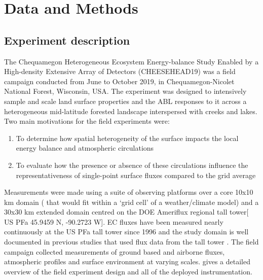 \documentclass[draft]{agujournal2019}
\begin{document}
%

\section{Data and Methods}

\subsection{ Experiment description}

The Chequamegon Heterogeneous Ecosystem Energy-balance Study Enabled by a High-density Extensive Array of Detectors  (CHEESEHEAD19) was a field campaign conducted from June to October 2019, in Chequamegon-Nicolet National Forest, Wisconsin, USA. The experiment was designed to intensively sample and scale land surface properties and the ABL responses to it across a heterogeneous mid-latitude forested landscape interspersed with creeks and lakes.
Two main motivations for the field experiments were:

\begin{enumerate}
    \item To determine how spatial heterogeneity of the surface impacts the local energy balance and  atmospheric circulations
    \item To evaluate how the presence or absence of these circulations influence the representativeness of single-point surface fluxes compared to the grid average 
\end{enumerate}

Measurements were made using a suite of observing platforms over a core 10x10 km domain ( that would fit within a ‘grid cell’ of a weather/climate model)  and a 30x30 km extended domain centred on the DOE Ameriflux regional tall tower[ US PFa 45.9459 N, -90.2723 W].  EC fluxes have been measured nearly continuously at the US PFa tall tower since 1996 \cite{berger_long-term_2001} and the study domain  is well documented in previous studies that used flux data from the tall tower \cite{davis_annual_2003, desai_influence_2014, desai_landscape-level_2015}. The field campaign collected measurements of ground based and airborne fluxes, atmospheric profiles and surface environment at varying scales.  gives a detailed overview of the field experiment design and all of the deployed instrumentation. 
\end{document}
